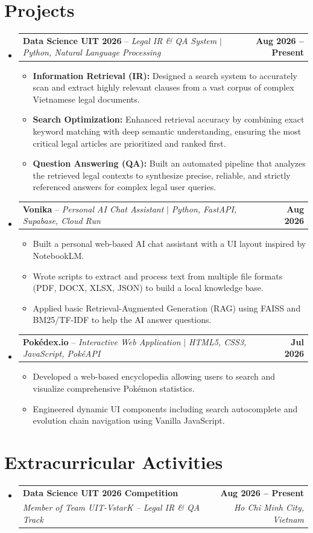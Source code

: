 \documentclass[letterpaper,11pt]{article}
\makeatletter
\newcommand{\resumeItem}[1]{
  \item\small{
    {#1 \vspace{-2pt}}
  }
}
\newcommand{\resumeEduHeading}[4]{
  \vspace{-2pt}\item
    \begin{tabular*}{1.0\textwidth}[t]{l@{\extracolsep{\fill}}r}
      \textbf{#1} & \textbf{#2} \\
      \textit{\small#3} & \textit{\small #4} \\
    \end{tabular*}\vspace{-7pt}
}
\newcommand{\resumeProjectHeading}[2]{
    \item
    \begin{tabular*}{1.0\textwidth}{l@{\extracolsep{\fill}}r}
      \small#1 & \textbf{#2} \\
    \end{tabular*}\vspace{-7pt}
}
\newcommand{\resumeSubHeadingListStart}{\begin{itemize}[leftmargin=0.0in, label={}]}
\newcommand{\resumeSubHeadingListEnd}{\end{itemize}}
\newcommand{\resumeItemListStart}{\begin{itemize}}
\newcommand{\resumeItemListEnd}{\end{itemize}\vspace{-5pt}}
\makeatother
\begin{document}
\section{Projects}
    \resumeSubHeadingListStart
      \resumeProjectHeading
          {\textbf{Data Science UIT 2026} -- \emph{Legal IR \& QA System} $|$ \emph{Python, Natural Language Processing}}{Aug 2026 -- Present}
          \resumeItemListStart
            \resumeItem{\textbf{Information Retrieval (IR):} Designed a search system to accurately scan and extract highly relevant clauses from a vast corpus of complex Vietnamese legal documents.}
            \resumeItem{\textbf{Search Optimization:} Enhanced retrieval accuracy by combining exact keyword matching with deep semantic understanding, ensuring the most critical legal articles are prioritized and ranked first.}
            \resumeItem{\textbf{Question Answering (QA):} Built an automated pipeline that analyzes the retrieved legal contexts to synthesize precise, reliable, and strictly referenced answers for complex legal user queries.}
          \resumeItemListEnd
          
      \resumeProjectHeading
          {\textbf{Vonika} -- \emph{Personal AI Chat Assistant} $|$ \emph{Python, FastAPI, Supabase, Cloud Run}}{Aug 2026}
          \resumeItemListStart
            \resumeItem{Built a personal web-based AI chat assistant with a UI layout inspired by NotebookLM.}
            \resumeItem{Wrote scripts to extract and process text from multiple file formats (PDF, DOCX, XLSX, JSON) to build a local knowledge base.}\resumeItem{Applied basic Retrieval-Augmented Generation (RAG) using FAISS and BM25/TF-IDF to help the AI answer questions.}
          \resumeItemListEnd
          
      \resumeProjectHeading
          {\textbf{Pokédex.io} -- \emph{Interactive Web Application} $|$ \emph{HTML5, CSS3, JavaScript, PokéAPI}}{Jul 2026}
          \resumeItemListStart
            \resumeItem{Developed a web-based encyclopedia allowing users to search and visualize comprehensive Pokémon statistics.}
            \resumeItem{Engineered dynamic UI components including search autocomplete and evolution chain navigation using Vanilla JavaScript.}
          \resumeItemListEnd
    \resumeSubHeadingListEnd
\section{Extracurricular Activities}
  \resumeSubHeadingListStart
    \resumeEduHeading
      {Data Science UIT 2026 Competition}{Aug 2026 -- Present}
      {Member of Team UIT-VstarK -- Legal IR \& QA Track}{Ho Chi Minh City, Vietnam}
  \resumeSubHeadingListEnd
  
\end{document}
